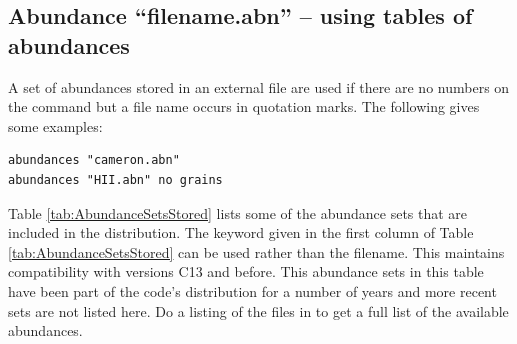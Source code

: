 \subsection{Abundance ``filename.abn'' -- using tables of abundances}

A set of abundances stored in an external file are used if there are no numbers on the
 command but a file name 
occurs in quotation marks. 
The following gives some examples:
\begin{verbatim}
abundances "cameron.abn"
abundances "HII.abn" no grains
\end{verbatim}


Table \ref{tab:AbundanceSetsStored} lists some of the abundance sets
that are included in the distribution.
The keyword given in the first column of Table \ref{tab:AbundanceSetsStored}
can be used rather than the filename.  
This maintains compatibility with versions C13 and before.
This abundance sets in this table have been part of the code's distribution for a number of years
and more recent sets are not listed here.
Do a listing of the  files in  
to get a full list of the available abundances.

